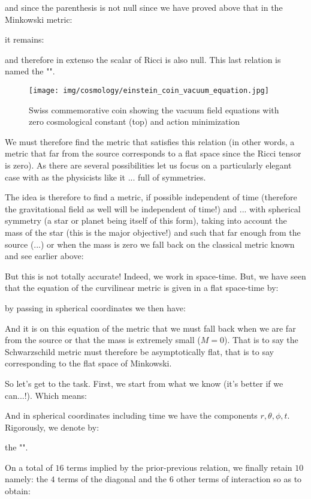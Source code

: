 	and since the parenthesis is not null since we have proved above that in the Minkowski metric:
	
	it remains:
	
	and therefore in extenso the scalar of Ricci is also null. This last relation is named the "".
	\begin{figure}[H]
		\centering
		\texttt{[image: img/cosmology/einstein\_coin\_vacuum\_equation.jpg]}	
		\caption{Swiss commemorative coin showing the vacuum field equations with zero cosmological constant (top) and action minimization}
	\end{figure}
	We must therefore find the metric that satisfies this relation (in other words, a metric that far from the source corresponds to a flat space since the Ricci tensor is zero). As there are several possibilities let us focus on a particularly elegant case with as the physicists like it ... full of symmetries.

	The idea is therefore to find a metric, if possible independent of time (therefore the gravitational field as well will be independent of time!) and ... with spherical symmetry (a star or planet being itself of this form), taking into account the mass of the star (this is the major objective!) and such that far enough from the source (...) or when the mass is zero we fall back on the classical metric known and see earlier above:
	
	But this is not totally accurate! Indeed, we work in space-time. But, we have seen that the equation of the curvilinear metric is given in a flat space-time by:
	
	by passing in spherical coordinates we then have:
	
	And it is on this equation of the metric that we must fall back when we are far from the source or that the mass is extremely small ($M=0$). That is to say the Schwarzschild metric must therefore be asymptotically flat, that is to say corresponding to the flat space of Minkowski.

	So let's get to the task. First, we start from what we know (it's better if we can...!). Which means:
	
	And in spherical coordinates including time we have the components $r,\theta,\phi,t$. Rigorously, we denote by:
	
	the "".
	
	On a total of $16$ terms implied by the prior-previous relation, we finally retain $10$ namely: the $4$ terms of the diagonal and the $6$ other terms of interaction so as to obtain:
	
